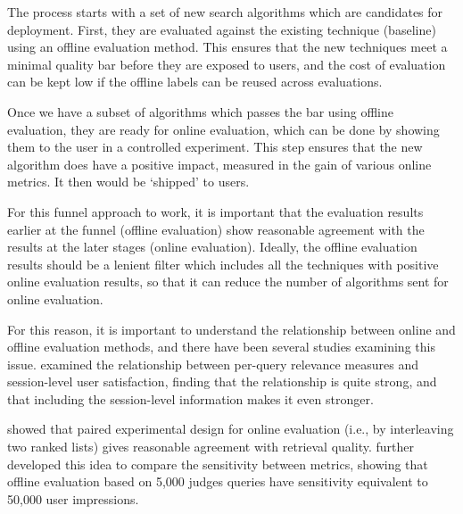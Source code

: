 The process starts with a set of new search algorithms which are candidates for deployment. First, they are evaluated against the existing technique (baseline) using an offline evaluation method. This ensures that the new techniques meet a minimal quality bar before they are exposed to users, and the cost of evaluation can be kept low if the offline labels can be reused across evaluations.

Once we have a subset of algorithms which passes the bar using offline evaluation, they are ready for online evaluation, which can be done by showing them to the user in a controlled experiment. This step ensures that the new algorithm does have a positive impact, measured in the gain of various online metrics. It then would be `shipped' to users.

For this funnel approach to work, it is important that the evaluation results earlier at the funnel (offline evaluation) show reasonable agreement with the results at the later stages (online evaluation). Ideally, the offline evaluation results should be a lenient filter which includes all the techniques with positive online evaluation results, so that it can reduce the number of algorithms sent for online evaluation.

For this reason, it is important to understand the relationship between online and offline evaluation methods, and there have been several studies examining this issue. \cite{Huffman:2007} examined the relationship between per-query relevance measures and session-level user satisfaction, finding that the relationship is quite strong, and that including the session-level information makes it even stronger. 

\cite{Radlinski:2008} showed that paired experimental design for online evaluation (i.e., by interleaving two ranked lists) gives reasonable agreement with retrieval quality. \cite{radl:comp10} further developed this idea to compare the sensitivity between metrics, showing that offline evaluation based on 5,000 judges queries have sensitivity equivalent to 50,000 user impressions.

